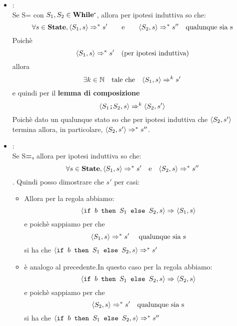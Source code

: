 {\begin{itemize}
	\item {}:	
	\casespace{}
	\\
	
	Se S=	con $S_1,S_2\in\mbox{\textbf{While\textsuperscript{-}}}$, allora per ipotesi
	induttiva so che: 
	\[ \forall{}s\in\mbox{\textbf{State}}, \langle{}S_1, s\rangle{}\Rightarrow^{*}s' \qquad  \textrm{e} 
	\qquad \langle{}S_2, s\rangle{}\Rightarrow^{*}s''\quad \textrm{qualunque sia s} \]
	Poichè 
	\[ \langle{}S_1, s\rangle{}\Rightarrow^{*}s' \quad \textrm{(per ipotesi induttiva)} \]
	allora 
	\[ \exists{}k\in\mathbb{N}  \quad \textrm{tale che}  \quad \langle{}S_1, s\rangle{}
	\Rightarrow^{k}s'\]
	e quindi per il \textbf{lemma di composizione}
	\[ 	\langle{}\textrm{\normalfont{\texttt{$S_1$;$S_2$}}}, s\rangle{}\Rightarrow^{k}\langle{}S_2, s'\rangle{} \] 
	Poichè	dato un qualunque stato so che per ipotesi induttiva che  
	$ \langle{}S_2, s'\rangle{} $ 
	termina allora, in particolare, $\langle{}S_2, s'\rangle{}\Rightarrow^{*}s''$.

	\item {}: 	
	\casespace{}
	\\
	
	Se S\textbf{=,} allora per ipotesi induttiva so che: 
	\[ \forall{}s\in\mbox{\textbf{State}}, \langle{}S_1, s\rangle{}\Rightarrow^{*}s' \quad \textrm{e} \quad 
	\langle{}S_2, s\rangle{}\Rightarrow^{*}s'' \]. Quindi posso dimostrare che 
	\Rar{*}$s'$ per casi:
	\begin{itemize}
	\item {} Allora per la regola \ifttSOS{} abbiamo:
	\[ \langle{}\mbox{\normalfont{\texttt{if }}} b \textrm{\normalfont{\texttt{ then }}} S_1 \textrm{\normalfont{\texttt{ else }}} S_2, s\rangle{}\Rightarrow^{}\langle{}{S_1}, s\rangle{} \] e poichè
	sappiamo per \hi{} che \[ \langle{}S_1, s\rangle{}\Rightarrow^{*}s' \quad 
	\textrm{ qualunque sia s} \] si ha che 
	$\langle{}\mbox{\normalfont{\texttt{if }}} b \textrm{\normalfont{\texttt{ then }}} S_1 \textrm{\normalfont{\texttt{ else }}} S_2, s\rangle{}\Rightarrow^{*}s'$
	\postcasespace
	\item {} è analogo al precedente.In questo caso
	per la regola \ifffSOS{} abbiamo:
	\[ \langle{}\mbox{\normalfont{\texttt{if }}} b \textrm{\normalfont{\texttt{ then }}} S_1 \textrm{\normalfont{\texttt{ else }}} S_2, s\rangle{}\Rightarrow^{}\langle{}{S_2}, s\rangle{}  \]e poichè
	sappiamo
	per \hi{} che \[ \langle{}S_2, s\rangle{}\Rightarrow^{*}s' \quad \textrm{qualunque sia s} \]
	si ha che $\langle{}\mbox{\normalfont{\texttt{if }}} b \textrm{\normalfont{\texttt{ then }}} S_1 \textrm{\normalfont{\texttt{ else }}} S_2, s\rangle{}\Rightarrow^{*}s''$
	\end{itemize}

	\end{itemize}
}
\newpage